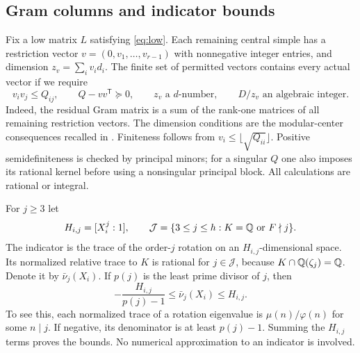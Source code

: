 \subsection{Gram columns and indicator bounds}
Fix a low matrix $L$ satisfying \eqref{eq:low}. Each remaining central
simple has a restriction vector $v=(0,v_1,\ldots,v_{r-1})$ with
nonnegative integer entries, and dimension $z_v=\sum_i v_i d_i$.
The finite set of permitted vectors contains every actual vector if we
require
\begin{equation}\label{eq:high}
 v_iv_j\le Q_{ij},\qquad Q-vv^{\mathsf T}\succeq0,\qquad
 z_v\text{ a }d\text{-number},\qquad D/z_v\text{ an algebraic integer}.
\end{equation}
Indeed, the residual Gram matrix is a sum of the rank-one matrices of
all remaining restriction vectors. The dimension conditions are the
modular-center consequences recalled in \cite[Proposition 2.1]{DP}.
Finiteness follows from $v_i\le\lfloor\sqrt{Q_{ii}}\rfloor$.
Positive semidefiniteness is checked by principal minors; for a singular
$Q$ one also imposes its rational kernel before using a nonsingular
principal block. All calculations are rational or integral.

For $j\ge3$ let
\[
 H_{i,j}=[X_i^j:1],\qquad
 \mathcal J=\{3\le j\le h:K=\mathbb Q\text{ or }F\nmid j\}.
\]
The indicator is the trace of the order-$j$ rotation on an
$H_{i,j}$-dimensional space. Its normalized relative trace to $K$ is
rational for $j\in\mathcal J$, because
$K\cap\mathbb Q(\zeta_j)=\mathbb Q$. Denote it by $\bar\nu_j(X_i)$.
If $p(j)$ is the least prime divisor of $j$, then
\begin{equation}\label{eq:indicator-bound}
 -\frac{H_{i,j}}{p(j)-1}\le \bar\nu_j(X_i)\le H_{i,j}.
\end{equation}
To see this, each normalized trace of a rotation eigenvalue is
$\mu(n)/\varphi(n)$ for some $n\mid j$. If negative, its denominator is
at least $p(j)-1$. Summing the $H_{i,j}$ terms proves the bounds.
No numerical approximation to an indicator is involved.

